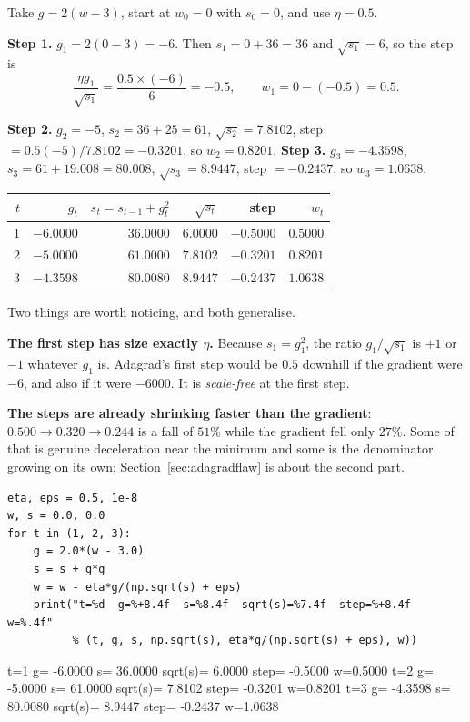 \documentclass[11pt]{article}
\begin{document}
\begin{worked}[Three steps of Adagrad on $f(w)=(w-3)^2$]
Take $g = 2(w-3)$, start at $w_0 = 0$ with $s_0 = 0$, and use $\eta = 0.5$.

\medskip
\textbf{Step 1.} $g_1 = 2(0-3) = -6$. Then $s_1 = 0 + 36 = 36$ and
$\sqrt{s_1} = 6$, so the step is
\[
  \frac{\eta g_1}{\sqrt{s_1}} = \frac{0.5 \times (-6)}{6} = -0.5,
  \qquad w_1 = 0 - (-0.5) = 0.5 .
\]

\textbf{Step 2.} $g_2 = -5$, $s_2 = 36 + 25 = 61$, $\sqrt{s_2} = 7.8102$, step
$= 0.5(-5)/7.8102 = -0.3201$, so $w_2 = 0.8201$. \textbf{Step 3.}
$g_3 = -4.3598$, $s_3 = 61 + 19.008 = 80.008$, $\sqrt{s_3} = 8.9447$, step
$=-0.2437$, so $w_3 = 1.0638$.

\begin{center}
\begin{tabular}{@{}rrrrrr@{}}
\toprule
$t$ & $g_t$ & $s_t = s_{t-1} + g_t^2$ & $\sqrt{s_t}$ & step & $w_t$\\
\midrule
1 & $-6.0000$ & $36.0000$ & $6.0000$ & $-0.5000$ & $0.5000$\\
2 & $-5.0000$ & $61.0000$ & $7.8102$ & $-0.3201$ & $0.8201$\\
3 & $-4.3598$ & $80.0080$ & $8.9447$ & $-0.2437$ & $1.0638$\\
\bottomrule
\end{tabular}
\end{center}

Two things are worth noticing, and both generalise.

\textbf{The first step has size exactly $\eta$.} Because $s_1 = g_1^2$, the
ratio $g_1/\sqrt{s_1}$ is $+1$ or $-1$ whatever $g_1$ is. Adagrad's first step
would be $0.5$ downhill if the gradient were $-6$, and also if it were
$-6000$. It is \emph{scale-free} at the first step.

\textbf{The steps are already shrinking faster than the gradient}: $0.500 \to
0.320 \to 0.244$ is a fall of $51\%$ while the gradient fell only $27\%$. Some
of that is genuine deceleration near the minimum and some is the denominator
growing on its own; Section~\ref{sec:adagradflaw} is about the second part.
\end{worked}

\begin{lstlisting}
eta, eps = 0.5, 1e-8
w, s = 0.0, 0.0
for t in (1, 2, 3):
    g = 2.0*(w - 3.0)
    s = s + g*g
    w = w - eta*g/(np.sqrt(s) + eps)
    print("t=%d  g=%+8.4f  s=%8.4f  sqrt(s)=%7.4f  step=%+8.4f  w=%.4f"
          % (t, g, s, np.sqrt(s), eta*g/(np.sqrt(s) + eps), w))
\end{lstlisting}
\begin{codeout}
t=1  g= -6.0000  s= 36.0000  sqrt(s)= 6.0000  step= -0.5000  w=0.5000
t=2  g= -5.0000  s= 61.0000  sqrt(s)= 7.8102  step= -0.3201  w=0.8201
t=3  g= -4.3598  s= 80.0080  sqrt(s)= 8.9447  step= -0.2437  w=1.0638
\end{codeout}
\end{document}
